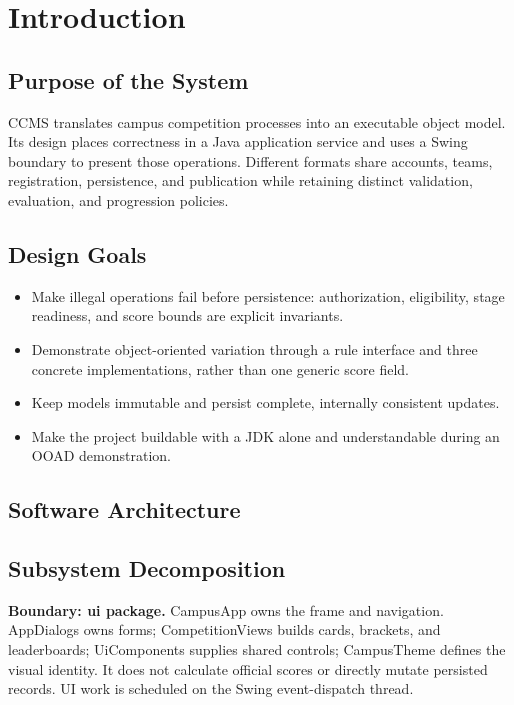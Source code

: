 \section{Introduction}
\subsection{Purpose of the System}
CCMS translates campus competition processes into an executable object model. Its design places correctness in a Java application service and uses a Swing boundary to present those operations. Different formats share accounts, teams, registration, persistence, and publication while retaining distinct validation, evaluation, and progression policies.
\subsection{Design Goals}
\begin{itemize}
\item Make illegal operations fail before persistence: authorization, eligibility, stage readiness, and score bounds are explicit invariants.
\item Demonstrate object-oriented variation through a rule interface and three concrete implementations, rather than one generic score field.
\item Keep models immutable and persist complete, internally consistent updates.
\item Make the project buildable with a JDK alone and understandable during an OOAD demonstration.
\end{itemize}

\begin{umlpage}
\section{Software Architecture}
\subsection{Subsystem Decomposition}
\end{umlpage}
\textbf{Boundary: ui package.} CampusApp owns the frame and navigation. AppDialogs owns forms; CompetitionViews builds cards, brackets, and leaderboards; UiComponents supplies shared controls; CampusTheme defines the visual identity. It does not calculate official scores or directly mutate persisted records. UI work is scheduled on the Swing event-dispatch thread.

